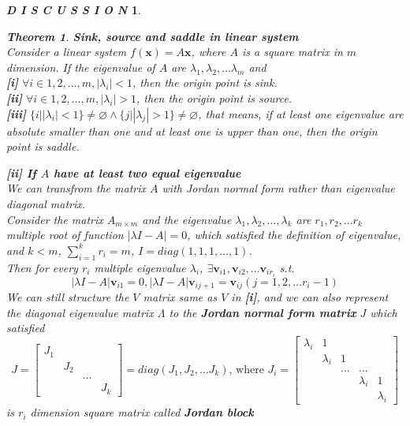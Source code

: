 \documentclass[12pt]{article}
\theoremstyle{plain}
\newtheorem{theorem}{\textbf{Theorem}}[section]
\newtheorem{discussion}{\textit{D I S C U S S I O N}}[section]
\begin{document}
\begin{discussion}
\begin{theorem}\label{sink-source-saddle-linear-system}\textbf{Sink, source and saddle in linear system}
\\\noindent Consider a linear system $f(\mathbf x) = A \mathbf x$, where $A$ is a square matrix in $m$ dimension. If the eigenvalue of $A$ are $\lambda_1, \lambda_2, \ldots \lambda_m$ and
\\\noindent \textbf{[i]} $\forall i \in 1, 2, \ldots, m, |\lambda_i| < 1$, then the origin point is sink.
\\\noindent \textbf{[ii]} $\forall i \in 1, 2, \ldots, m, |\lambda_i| > 1$, then the origin point is source.
\\\noindent \textbf{[iii]} $\{i | |\lambda_i| < 1\} \neq \varnothing \land \{j | |\lambda_j| > 1\} \neq \varnothing$, that means, if at least one eigenvalue are absolute smaller than one and at least one is upper than one, then the origin point is saddle.\\
\end{theorem}





  \noindent \textbf{[ii] If $A$ have at least two equal eigenvalue} 
\\\noindent We can transfrom the matrix $A$ with Jordan normal form rather than eigenvalue diagonal matrix.
\\\noindent Consider the matrix $A_{m\times m}$ and the eigenvalue $\lambda_{1}, \lambda_{2}, \ldots, \lambda_{k}$ are $r_1, r_2, \ldots r_k$ multiple root of function $|\lambda I - A| = 0$, which satisfied the definition of eigenvalue, and $k < m$, $\sum_{i = 1}^{k} r_i = m$, $I = diag(1, 1, 1, \ldots, 1)$. 
\\\noindent Then for every $r_i$ multiple eigenvalue $\lambda_i$, $\exists \mathbf v_{i1}, \mathbf v_{i2}, \ldots \mathbf v_{i r_i}$ s.t.
$$
|\lambda I - A|\mathbf v_{i1} = 0, |\lambda I - A|\mathbf v_{ij+1} = \mathbf v_{ij}(j = 1, 2, \ldots r_i - 1)
$$
We can still structure the $V$ matrix same as $V$ in \textbf{[i]}, and we can also represent the diagonal eigenvalue matrix $\Lambda$ to the \textbf{ Jordan normal form matrix} $J$ which satisfied 
$$
J = \left[
\begin{array}{cccc}
J_{1} \\
& J_{2} \\
& & \ldots \\
& & & J_{k}
\end{array}
\right] = diag(J_1, J_2, \ldots J_k) \text{, where } J_i =\left[
\begin{array}{ccccc}
\lambda_i & 1 \\
& \lambda_i & 1 \\
& & \ldots & \ldots \\
& & & \lambda_i & 1 \\
& & & & \lambda_i
\end{array} \right]
$$
is $r_i$ dimension square matrix called \textbf{Jordan block}


\end{discussion}
\end{document}
